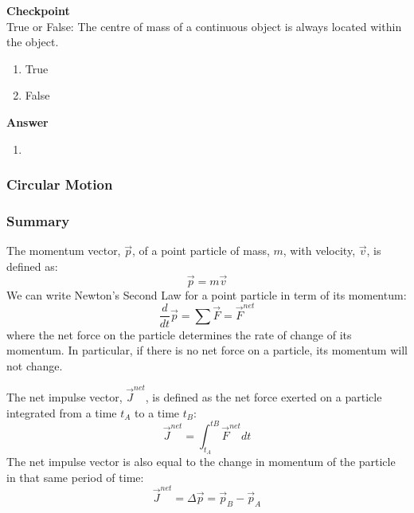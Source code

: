 \begin{framed}
\textbf{Checkpoint}\\
True or False: The centre of mass of a continuous object is always located within the object.

\begin{enumerate}
\item True
\item False
\end{enumerate}

\begin{framed}
\textbf{Answer}\\
\begin{enumerate}[resume]
\item
\end{enumerate}
\end{framed}
\end{framed}

\subsubsection{Circular Motion}\label{sec:momentumandcm:circularmotion}

\subsubsection{Summary}

The momentum vector, $\vec p$, of a point particle of mass, $m$, with velocity, $\vec v$, is defined as:
\begin{equation}
\vec p = m\vec v
\end{equation}
We can write Newton's Second Law for a point particle in term of its momentum:
\begin{equation}
\frac{d}{dt}\vec p = \sum \vec F = \vec F^{net}
\end{equation}
where the net force on the particle determines the rate of change of its momentum. In particular, if there is no net force on a particle, its momentum will not change.

The net impulse vector, $\vec J^{net}$, is defined as the net force exerted on a particle integrated from a time $t_A$ to a time $t_B$:
\begin{equation}
\vec J^{net} = \int_{t_A}^{tB} \vec F^{net} dt
\end{equation}
The net impulse vector is also equal to the change in momentum of the particle in that same period of time:
\begin{equation}
\vec J^{net} = \Delta \vec p = \vec p_B - \vec p_A
\end{equation}

